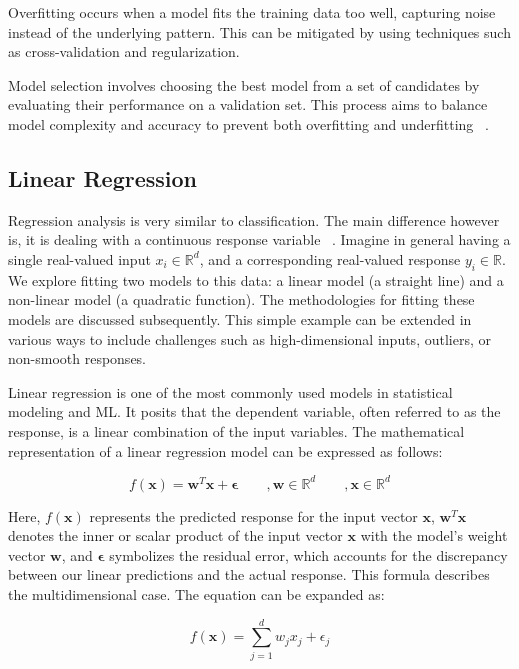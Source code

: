 Overfitting occurs when a model fits the training data too well, capturing noise instead of the underlying pattern. This can be mitigated by using techniques such as cross-validation and regularization.

Model selection involves choosing the best model from a set of candidates by evaluating their performance on a validation set. This process aims to balance model complexity and accuracy to prevent both overfitting and underfitting ~\cite{murphy2013machine}.

\subsection{Linear Regression}

Regression analysis is very similar to classification. The main difference however is, it is dealing with a continuous response variable ~\cite{murphy2013machine}. Imagine in general having a single real-valued input $x_i \in \mathbb{R}^d$, and a corresponding real-valued response $y_i \in \mathbb{R}$. We explore fitting two models to this data: a linear model (a straight line) and a non-linear model (a quadratic function). The methodologies for fitting these models are discussed subsequently. This simple example can be extended in various ways to include challenges such as high-dimensional inputs, outliers, or non-smooth responses.

Linear regression is one of the most commonly used models in statistical modeling and ML. It posits that the dependent variable, often referred to as the response, is a linear combination of the input variables. The mathematical representation of a linear regression model can be expressed as follows:

\begin{equation}
    f(\mathbf{x}) = \mathbf{w}^T \mathbf{x} + \mathbf{\epsilon} \qquad, \mathbf{w} \in \mathbb{R}^{d} \qquad , \mathbf{x} \in \mathbb{R}^d
\end{equation}

Here, $f(\mathbf{x})$ represents the predicted response for the input vector $\mathbf{x}$, $\mathbf{w}^T \mathbf{x}$ denotes the inner or scalar product of the input vector $\mathbf{x}$ with the model's weight vector $\mathbf{w}$, and $\mathbf{\epsilon}$ symbolizes the residual error, which accounts for the discrepancy between our linear predictions and the actual response. This formula describes the multidimensional case. The equation can be expanded as:

\begin{equation}
    f(\mathbf{x}) = \sum_{j=1}^d w_j x_j + \epsilon_{j}
\end{equation}

